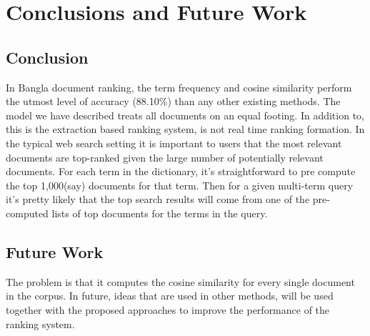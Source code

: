 \chapter{Conclusions and Future Work}
\label{Ch_Conclusion}

\section{Conclusion}

In Bangla document ranking, the term frequency and cosine similarity perform the utmost level of accuracy (88.10\%) than any other existing methods. The model we have described treats all documents on an equal footing. In addition to, this is the extraction based ranking system, is not real time ranking formation. In the typical web search setting it is important to users that the most relevant documents are top-ranked given the large number of potentially relevant documents. For each term in the dictionary, it’s straightforward to pre compute the top 1,000(say) documents for that term. Then for a given multi-term query it’s pretty likely that the top search results will come from one of the pre-computed lists of top documents for the terms in the query.

\section{Future Work}

The problem is that it computes the cosine similarity for every single document in the corpus. In future, ideas that are used in other methods, will be used together with the proposed approaches to improve the performance of the ranking system.